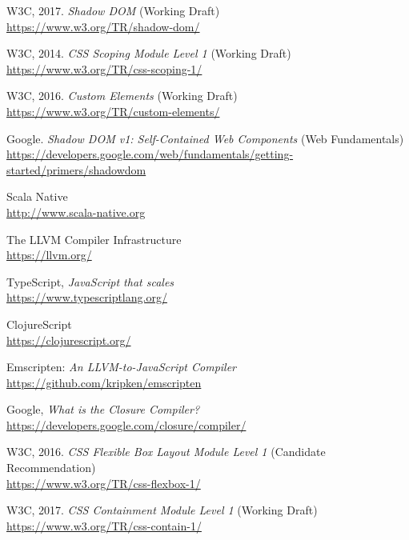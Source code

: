 \begin{thebibliography}{99}
W3C, 2017. \emph{Shadow DOM} (Working Draft)\\
\url{https://www.w3.org/TR/shadow-dom/}

W3C, 2014. \emph{CSS Scoping Module Level 1} (Working Draft)\\
\url{https://www.w3.org/TR/css-scoping-1/}

W3C, 2016. \emph{Custom Elements} (Working Draft)\\
\url{https://www.w3.org/TR/custom-elements/}

Google. \emph{Shadow DOM v1: Self-Contained Web Components} (Web Fundamentals)\\
\url{https://developers.google.com/web/fundamentals/getting-started/primers/shadowdom}

Scala Native\\
\url{http://www.scala-native.org}

The LLVM Compiler Infrastructure\\
\url{https://llvm.org/}

TypeScript, \emph{JavaScript that scales}\\
\url{https://www.typescriptlang.org/}

ClojureScript\\
\url{https://clojurescript.org/}

Emscripten: \emph{An LLVM-to-JavaScript Compiler}\\
\url{https://github.com/kripken/emscripten}

Google, \emph{What is the Closure Compiler?}\\
\url{https://developers.google.com/closure/compiler/}

W3C, 2016. \emph{CSS Flexible Box Layout Module Level 1} (Candidate Recommendation)\\
\url{https://www.w3.org/TR/css-flexbox-1/}

W3C, 2017. \emph{CSS Containment Module Level 1} (Working Draft)\\
\url{https://www.w3.org/TR/css-contain-1/}

\end{thebibliography}